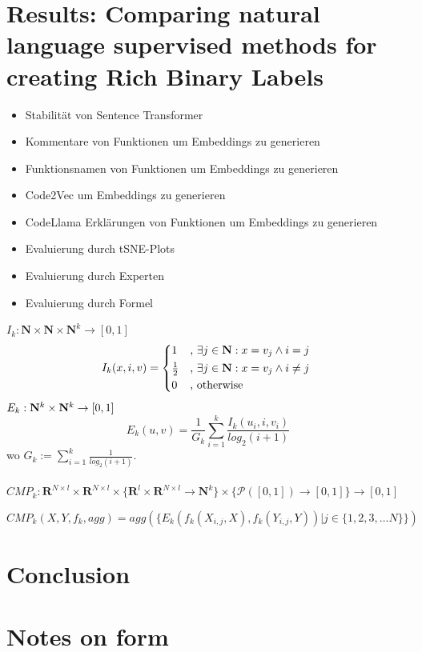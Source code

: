 \documentclass[12pt,letterpaper,ngerman]{article}
\begin{document}
\section{Results: Comparing natural language supervised methods for creating Rich Binary Labels}
\begin{itemize}
  \item Stabilität von Sentence Transformer
  \item Kommentare von Funktionen um Embeddings zu generieren
  \item Funktionsnamen von Funktionen um Embeddings zu generieren
  \item Code2Vec um Embeddings zu generieren
  \item CodeLlama Erklärungen von Funktionen um Embeddings zu generieren
  \item Evaluierung durch tSNE-Plots
  \item Evaluierung durch Experten
  \item Evaluierung durch Formel
\end{itemize}
$ I_{k}: \mathbf{N} \times \mathbf{N} \times \mathbf{N}^{k} \to [0,1]$
\[ I_{k}(x,i,v) = \begin{cases*} 
      1 & , $\exists j \in \mathbf{N}: x = v_j \land i = j$  \\
      \frac{1}{2} & , $\exists j \in \mathbf{N}: x = v_j \land i \neq j$\\
      0   & , \text{otherwise}
                \end{cases*} \]
$E_k: \mathbf{N}^k \times \mathbf{N}^k \to [0,1]$
\[ E_k(u,v) = \frac{1}{G_k} \sum^{k}_{i=1} \frac{I_k(u_i,i,v_i)}{log_2(i+1)}\]
wo $G_k := \sum_{i=1}^{k} \frac{1}{log_2(i+1)}$.\\\\
$CMP_k: \mathbf{R}^{N\times l} \times \mathbf{R}^{N\times l} \times 
\{ \mathbf{R}^l \times \mathbf{R}^{N\times l} \to \mathbf{N}^k \} 
\times \{ \mathcal{P}([0,1]) \to [0,1] \} \to [0,1]$

\[ CMP_k(X,Y,f_k,agg) = agg(\{E_k(f_k(X_{i,j},X),f_k(Y_{i,j},Y)) | j \in \{1,2,3, \dots N\}\})\]


\section{Conclusion}


\section{Notes on form}
\end{document}
